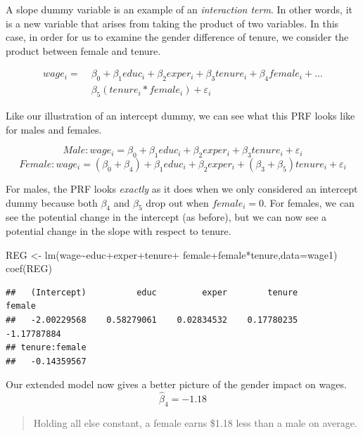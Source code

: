 \documentclass[
]{book}
\newenvironment{Shaded}{\begin{snugshade}}{\end{snugshade}}
\newcommand{\AttributeTok}[1]{\textcolor[rgb]{0.77,0.63,0.00}{#1}}
\newcommand{\FunctionTok}[1]{\textcolor[rgb]{0.00,0.00,0.00}{#1}}
\newcommand{\NormalTok}[1]{#1}
\newcommand{\OtherTok}[1]{\textcolor[rgb]{0.56,0.35,0.01}{#1}}
\newcommand{\SpecialCharTok}[1]{\textcolor[rgb]{0.00,0.00,0.00}{#1}}
\begin{document}
A slope dummy variable is an example of an \emph{interaction term}. In other words, it is a new variable that arises from taking the product of two variables. In this case, in order for us to examine the gender difference of tenure, we consider the product between female and tenure.

\[\begin{aligned}
wage_i = \;&\beta_0+\beta_1educ_i+\beta_2exper_i+ \beta_3tenure_i+\beta_4female_i+... \\ &\beta_5(tenure_i*female_i)+\varepsilon_i 
\end{aligned}\]

Like our illustration of an intercept dummy, we can see what this PRF looks like for males and females.

\[Male: wage_i=\beta_0+\beta_1educ_i+\beta_2exper_i+\beta_3tenure_i+\varepsilon_i\]
\[Female: wage_i=(\beta_0+\beta_4)+\beta_1educ_i+\beta_2exper_i+(\beta_3+\beta_5)tenure_i+\varepsilon_i\]

For males, the PRF looks \emph{exactly} as it does when we only considered an intercept dummy because both \(\beta_4\) and \(\beta_5\) drop out when \(female_i = 0\). For females, we can see the potential change in the intercept (as before), but we can now see a potential change in the slope with respect to tenure.

\begin{Shaded}
\begin{Highlighting}[]
\NormalTok{REG }\OtherTok{\textless{}{-}} \FunctionTok{lm}\NormalTok{(wage}\SpecialCharTok{\textasciitilde{}}\NormalTok{educ}\SpecialCharTok{+}\NormalTok{exper}\SpecialCharTok{+}\NormalTok{tenure}\SpecialCharTok{+}
\NormalTok{            female}\SpecialCharTok{+}\NormalTok{female}\SpecialCharTok{*}\NormalTok{tenure,}\AttributeTok{data=}\NormalTok{wage1)}
\FunctionTok{coef}\NormalTok{(REG)}
\end{Highlighting}
\end{Shaded}

\begin{verbatim}
##   (Intercept)          educ         exper        tenure        female 
##   -2.00229568    0.58279061    0.02834532    0.17780235   -1.17787884 
## tenure:female 
##   -0.14359567
\end{verbatim}

Our extended model now gives a better picture of the gender impact on wages.
\[\hat{\beta}_4 = -1.18\]

\begin{quote}
Holding all else constant, a female earns \$1.18 less than a male on average.
\end{quote}
\end{document}
